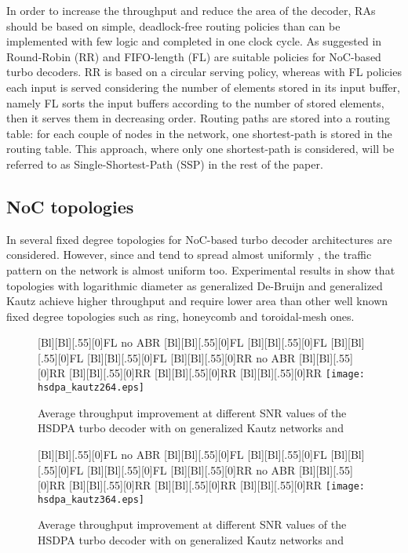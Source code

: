 \documentclass[10pt,twocolumn,journal]{IEEEtran}
\begin{document}
In order to increase the throughput and reduce the area of the decoder, RAs should be based on simple, deadlock-free 
routing policies than can be implemented with few logic and completed in one clock cycle. 
As suggested in \cite{martina_TCASI10} Round-Robin (RR) and FIFO-length (FL) are suitable policies for NoC-based turbo 
decoders. 
RR is based on a circular serving policy, whereas with FL policies each input is served considering 
the number of elements stored in its input buffer, namely 
FL sorts the input buffers according to the number of stored elements, then it serves them in decreasing order.
Routing paths are stored into a routing table: for each couple of nodes in the network, one shortest-path is stored in the 
routing table. This approach, where only one shortest-path is considered, will be referred to as Single-Shortest-Path 
(SSP) \cite{martina_TCASI10} in the rest of the paper.

\subsection{NoC topologies}

In \cite{martina_TCASI10} several fixed degree topologies for NoC-based turbo decoder architectures are considered. 
However, since  and  tend to spread almost uniformly , the 
traffic pattern on the network is almost uniform too. 
Experimental results in \cite{martina_TCASI10} show that topologies with logarithmic diameter as 
generalized De-Bruijn \cite{imase_TC81} and generalized Kautz \cite{imase_TC83} 
achieve higher throughput and require lower area than other well known fixed degree topologies such as ring, 
honeycomb and toroidal-mesh ones.
\begin{figure}[t!]
  \centering
  [Bl][Bl][.55][0]{FL no ABR}
  [Bl][Bl][.55][0]{FL }
  [Bl][Bl][.55][0]{FL }
  [Bl][Bl][.55][0]{FL }
  [Bl][Bl][.55][0]{FL }
  [Bl][Bl][.55][0]{RR no ABR}
  [Bl][Bl][.55][0]{RR }
  [Bl][Bl][.55][0]{RR }
  [Bl][Bl][.55][0]{RR }
  [Bl][Bl][.55][0]{RR }
  \texttt{[image: hsdpa\_kautz264.eps]}
\caption{Average throughput improvement at different SNR values of the HSDPA  turbo decoder with  
on generalized Kautz networks  and }
\label{fig:ABR_hsdpa2}
\end{figure}
\begin{figure}[t!]
    \centering
      [Bl][Bl][.55][0]{FL no ABR}
      [Bl][Bl][.55][0]{FL }
      [Bl][Bl][.55][0]{FL }
      [Bl][Bl][.55][0]{FL }
      [Bl][Bl][.55][0]{FL }
      [Bl][Bl][.55][0]{RR no ABR}
      [Bl][Bl][.55][0]{RR }
      [Bl][Bl][.55][0]{RR }
      [Bl][Bl][.55][0]{RR }
      [Bl][Bl][.55][0]{RR }
      \texttt{[image: hsdpa\_kautz364.eps]}
\caption{Average throughput improvement at different SNR values of the HSDPA  turbo decoder with  
on generalized Kautz networks  and }
\label{fig:ABR_hsdpa3}
\end{figure}
\end{document}
